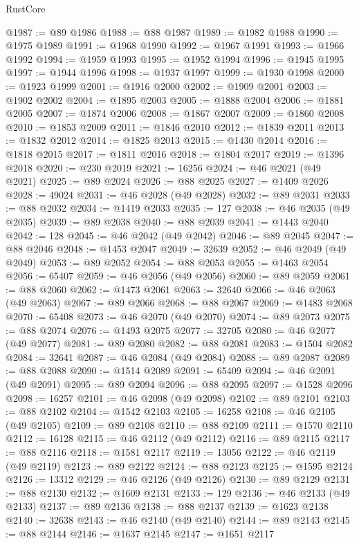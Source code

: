 \begin{lexlean}{RustCore}
\begin{coremodule}
@1987 := @89 @1986
@1988 := @88 @1987
@1989 := @1982 @1988
@1990 := @1975 @1989
@1991 := @1968 @1990
@1992 := @1967 @1991
@1993 := @1966 @1992
@1994 := @1959 @1993
@1995 := @1952 @1994
@1996 := @1945 @1995
@1997 := @1944 @1996
@1998 := @1937 @1997
@1999 := @1930 @1998
@2000 := @1923 @1999
@2001 := @1916 @2000
@2002 := @1909 @2001
@2003 := @1902 @2002
@2004 := @1895 @2003
@2005 := @1888 @2004
@2006 := @1881 @2005
@2007 := @1874 @2006
@2008 := @1867 @2007
@2009 := @1860 @2008
@2010 := @1853 @2009
@2011 := @1846 @2010
@2012 := @1839 @2011
@2013 := @1832 @2012
@2014 := @1825 @2013
@2015 := @1430 @2014
@2016 := @1818 @2015
@2017 := @1811 @2016
@2018 := @1804 @2017
@2019 := @1396 @2018
@2020 := @230 @2019
@2021 := 16256
@2024 := @46 @2021 (@49 @2021)
@2025 := @89 @2024
@2026 := @88 @2025
@2027 := @1409 @2026
@2028 := 49024
@2031 := @46 @2028 (@49 @2028)
@2032 := @89 @2031
@2033 := @88 @2032
@2034 := @1419 @2033
@2035 := 127
@2038 := @46 @2035 (@49 @2035)
@2039 := @89 @2038
@2040 := @88 @2039
@2041 := @1443 @2040
@2042 := 128
@2045 := @46 @2042 (@49 @2042)
@2046 := @89 @2045
@2047 := @88 @2046
@2048 := @1453 @2047
@2049 := 32639
@2052 := @46 @2049 (@49 @2049)
@2053 := @89 @2052
@2054 := @88 @2053
@2055 := @1463 @2054
@2056 := 65407
@2059 := @46 @2056 (@49 @2056)
@2060 := @89 @2059
@2061 := @88 @2060
@2062 := @1473 @2061
@2063 := 32640
@2066 := @46 @2063 (@49 @2063)
@2067 := @89 @2066
@2068 := @88 @2067
@2069 := @1483 @2068
@2070 := 65408
@2073 := @46 @2070 (@49 @2070)
@2074 := @89 @2073
@2075 := @88 @2074
@2076 := @1493 @2075
@2077 := 32705
@2080 := @46 @2077 (@49 @2077)
@2081 := @89 @2080
@2082 := @88 @2081
@2083 := @1504 @2082
@2084 := 32641
@2087 := @46 @2084 (@49 @2084)
@2088 := @89 @2087
@2089 := @88 @2088
@2090 := @1514 @2089
@2091 := 65409
@2094 := @46 @2091 (@49 @2091)
@2095 := @89 @2094
@2096 := @88 @2095
@2097 := @1528 @2096
@2098 := 16257
@2101 := @46 @2098 (@49 @2098)
@2102 := @89 @2101
@2103 := @88 @2102
@2104 := @1542 @2103
@2105 := 16258
@2108 := @46 @2105 (@49 @2105)
@2109 := @89 @2108
@2110 := @88 @2109
@2111 := @1570 @2110
@2112 := 16128
@2115 := @46 @2112 (@49 @2112)
@2116 := @89 @2115
@2117 := @88 @2116
@2118 := @1581 @2117
@2119 := 13056
@2122 := @46 @2119 (@49 @2119)
@2123 := @89 @2122
@2124 := @88 @2123
@2125 := @1595 @2124
@2126 := 13312
@2129 := @46 @2126 (@49 @2126)
@2130 := @89 @2129
@2131 := @88 @2130
@2132 := @1609 @2131
@2133 := 129
@2136 := @46 @2133 (@49 @2133)
@2137 := @89 @2136
@2138 := @88 @2137
@2139 := @1623 @2138
@2140 := 32638
@2143 := @46 @2140 (@49 @2140)
@2144 := @89 @2143
@2145 := @88 @2144
@2146 := @1637 @2145
@2147 := @1651 @2117

\end{coremodule}
\end{lexlean}
